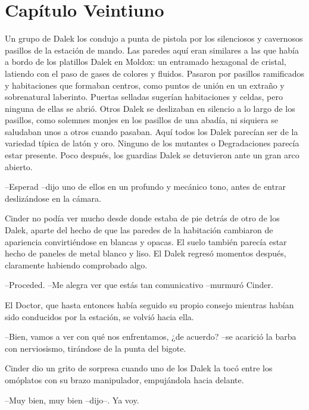 \chapter*{Capítulo Veintiuno}

Un grupo de Dalek los condujo a punta de pistola por los silenciosos y cavernosos pasillos de la estación de mando. Las paredes aquí eran similares a las que había a bordo de los platillos Dalek en Moldox: un entramado hexagonal de cristal, latiendo con el paso de gases de colores y fluidos.
Pasaron por pasillos ramificados y habitaciones que formaban centros, como puntos de unión en un extraño y sobrenatural laberinto. Puertas selladas sugerían habitaciones y celdas, pero ninguna de ellas se abrió. Otros Dalek se deslizaban en silencio a lo largo de los pasillos, como solemnes monjes en los pasillos de una abadía, ni siquiera se saludaban unos a otros cuando pasaban. Aquí todos los Dalek parecían ser de la variedad típica de latón y oro. Ninguno de los mutantes o Degradaciones parecía estar presente.
Poco después, los guardias Dalek se detuvieron ante un gran arco abierto.

--Esperad --dijo uno de ellos en un profundo y mecánico tono, antes de entrar deslizándose en la cámara.

Cinder no podía ver mucho desde donde estaba de pie detrás de otro de los Dalek, aparte del hecho de que las paredes de la habitación cambiaron de apariencia convirtiéndose en blancas y opacas. El suelo también parecía estar hecho de paneles de metal blanco y liso.
El Dalek regresó momentos después, claramente habiendo comprobado algo. 

--Proceded.
--Me alegra ver que estás tan comunicativo --murmuró Cinder.

El Doctor, que hasta entonces había seguido su propio consejo mientras habían sido conducidos por la estación, se volvió hacia ella. 

--Bien, vamos a ver con qué nos enfrentamos, ¿de acuerdo? --se acarició la barba con nerviosismo, tirándose de la punta del bigote.

Cinder dio un grito de sorpresa cuando uno de los Dalek la tocó entre los omóplatos con su brazo manipulador, empujándola hacia delante. 

--Muy bien, muy bien --dijo--. Ya voy.

